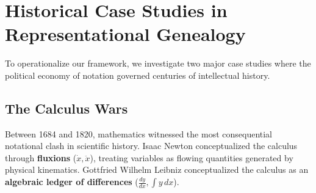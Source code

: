\documentclass[11pt,letterpaper]{article}
\begin{document}
\section{Historical Case Studies in Representational Genealogy}

To operationalize our framework, we investigate two major case studies where the political economy of notation governed centuries of intellectual history.

\subsection{The Calculus Wars}
Between 1684 and 1820, mathematics witnessed the most consequential notational clash in scientific history. Isaac Newton conceptualized the calculus through \textbf{fluxions} ($\dot{x}, \ddot{x}$), treating variables as flowing quantities generated by physical kinematics. Gottfried Wilhelm Leibniz conceptualized the calculus as an \textbf{algebraic ledger of differences} ($\frac{dy}{dx}, \int y\,dx$).
\end{document}

